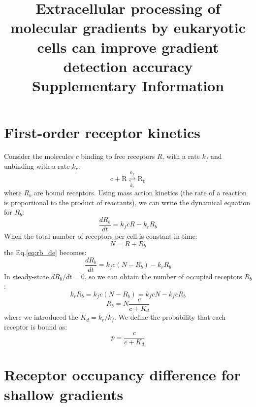 \documentclass[10pt]{article}
\date{}
\begin{document}
\linenumbers

\title{Extracellular processing of molecular gradients by eukaryotic cells can improve gradient detection accuracy\\
\textbf{Supplementary Information}}
\author{}
\maketitle
\tableofcontents

\newpage

\section{First-order receptor kinetics}


Consider the molecules $c$ binding to free receptors $R$, with a rate $k_f$ and unbinding with a rate $k_r$:
\begin{equation}
	\mathrm{c} + \mathrm{R} \overset{k_f}{\underset{k_r}{\rightleftharpoons}} \mathrm{R_b}
\end{equation}
where $R_b$ are bound receptors. Using mass action kinetics (the rate of a reaction is proportional to the product of reactants), we can write the dynamical equation for $R_b$:
\begin{equation}
	\frac{dR_b}{dt} = k_f cR - k_r R_b
	\label{eq:rb_de}
\end{equation}
When the total number of receptors per cell is constant in time:
\begin{equation}
	N = R + R_b
\end{equation}
the Eq.\ref{eq:rb_de} becomes:
\begin{equation}
	\frac{dR_b}{dt} = k_f c(N-R_b) - k_r R_b
\end{equation}
In steady-state $dR_b/dt = 0$, so we can obtain the number of occupied receptors $R_b$:
\begin{equation}
	k_r R_b = k_f c(N - R_b) = k_f cN - k_f cR_b
\end{equation}
\begin{equation}
	R_b = N\frac{c}{c + K_d}
\end{equation}
where we introduced the $K_d = k_r / k_f$. We define the probability that each receptor is bound as:
\begin{equation}
	p = \frac{c}{c + K_d}
\end{equation}


\section{Receptor occupancy difference for shallow gradients}
\end{document}
